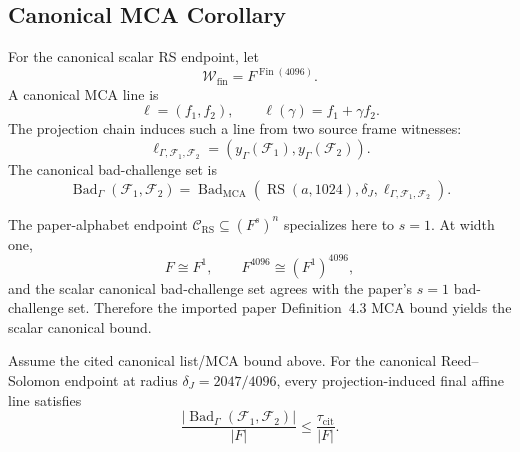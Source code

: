 \subsection{Canonical MCA Corollary}

For the canonical scalar RS endpoint, let
\[
  \mathcal W_{\mathrm{fin}}=F^{\operatorname{Fin}(4096)}.
\]
A canonical MCA line is
\[
  \ell=(f_1,f_2),\qquad
  \ell(\gamma)=f_1+\gamma f_2.
\]
The projection chain induces such a line from two source frame witnesses:
\[
  \ell_{\Gamma,\mathcal F_1,\mathcal F_2}
  =
  (y_\Gamma(\mathcal F_1),y_\Gamma(\mathcal F_2)).
\]
The canonical bad-challenge set is
\[
  \operatorname{Bad}_{\Gamma}(\mathcal F_1,\mathcal F_2)
  =
  \operatorname{Bad}_{\mathrm{MCA}}
  (\operatorname{RS}(a,1024),\delta_J,\ell_{\Gamma,\mathcal F_1,\mathcal F_2}).
\]

The paper-alphabet endpoint \(\mathcal C_{\mathrm{RS}}\subseteq(F^s)^n\) specializes here to
\(s=1\). At width one,
\[
  F\cong F^1,\qquad
  F^{4096}\cong(F^1)^{4096},
\]
and the scalar canonical bad-challenge set agrees with the paper's
\(s=1\) bad-challenge set. Therefore the imported paper Definition~4.3 MCA
bound yields the scalar canonical bound.

\begin{theorem}\label{thm:canonical-rs-mca}
Assume the cited canonical list/MCA bound above. For the canonical \HE{}
Reed--Solomon endpoint at radius
\(\delta_J=2047/4096\), every projection-induced final affine line satisfies
\[
  \frac{|\operatorname{Bad}_{\Gamma}(\mathcal F_1,\mathcal F_2)|}{|F|}
  \le
  \frac{\tau_{\mathrm{cit}}}{|F|}.
\]
\end{theorem}

